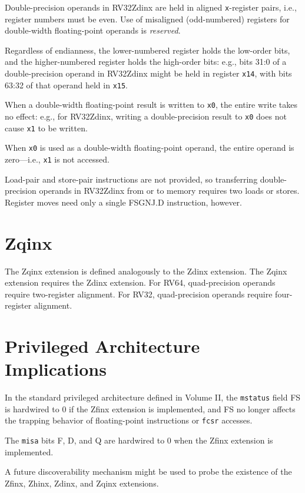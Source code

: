 Double-precision operands in RV32Zdinx
are held in aligned {\tt x}-register pairs, i.e.,
register numbers must be even.
Use of misaligned (odd-numbered) registers for double-width floating-point
operands is {\em reserved}.

Regardless of endianness, the lower-numbered register holds the low-order
bits, and the higher-numbered register holds the high-order bits: e.g., bits
31:0 of a double-precision operand in RV32Zdinx might be held in register
{\tt x14}, with bits 63:32 of that operand held in {\tt x15}.

When a double-width floating-point result is written to {\tt x0}, the entire
write takes no effect: e.g., for RV32Zdinx, writing a double-precision result
to {\tt x0} does not cause {\tt x1} to be written.

When {\tt x0} is used as a double-width floating-point operand, the entire
operand is zero---i.e., {\tt x1} is not accessed.

\begin{commentary}
Load-pair and store-pair instructions are not provided, so transferring
double-precision operands in RV32Zdinx from or to memory requires
two loads or stores.
Register moves need only a single FSGNJ.D instruction, however.
\end{commentary}

\section{Zqinx}

The Zqinx extension is defined analogously to the Zdinx extension.
The Zqinx extension requires the Zdinx extension.
For RV64, quad-precision operands require two-register alignment.
For RV32, quad-precision operands require four-register alignment.

\section{Privileged Architecture Implications}

In the standard privileged architecture defined in Volume II, the
{\tt mstatus} field FS is hardwired to 0 if the Zfinx extension is
implemented, and FS no longer affects the trapping behavior of
floating-point instructions or {\tt fcsr} accesses.

The {\tt misa} bits F, D, and Q are hardwired to 0 when the Zfinx
extension is implemented.

\begin{commentary}
A future discoverability mechanism might be used to probe the existence
of the Zfinx, Zhinx, Zdinx, and Zqinx extensions.
\end{commentary}

